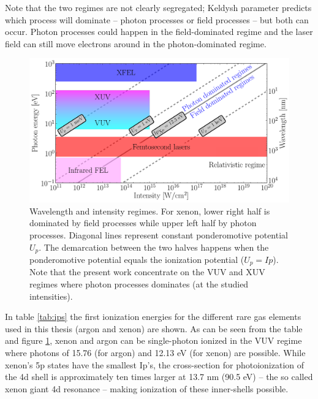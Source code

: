 Note that the two regimes are not clearly segregated; Keldysh parameter
predicts which process will dominate -- photon processes or field processes --
but both can occur. Photon processes could happen in the field-dominated
regime and the laser field can still move electrons around in the photon-dominated regime.

\begin{figure}
\centering
\includegraphics[width=\figurewidth]{figures/regimes}
\caption{Wavelength and intensity regimes. For xenon, lower right half is dominated
         by field processes while upper left half by photon processes. Diagonal
         lines represent constant ponderomotive potential $U_p$. The
         demarcation between the two halves happens when the ponderomotive
         potential equals the ionization potential ($U_p = Ip$).
         Note that the present work concentrate on the VUV and XUV regimes
         where photon processes dominates (at the studied intensities).}
\label{fig:regimes}
\end{figure}

In table \ref{tab:ips} the first ionization energies for the different
rare gas elements used in this thesis (argon and xenon) are shown. As can be
seen from the table and figure \ref{fig:regimes}, xenon and argon can be
single-photon ionized in the VUV regime where photons of 15.76 (for argon)
and 12.13 eV (for xenon) are possible. While xenon's 5p states have the smallest
Ip's, the cross-section for photoionization of the 4d shell is approximately ten
times larger at 13.7 nm (90.5 eV) -- the so called xenon giant 4d
resonance\cite{Becker1986} -- making ionization of these inner-shells
possible\cite{Thomas2009,Ackad2013}.

